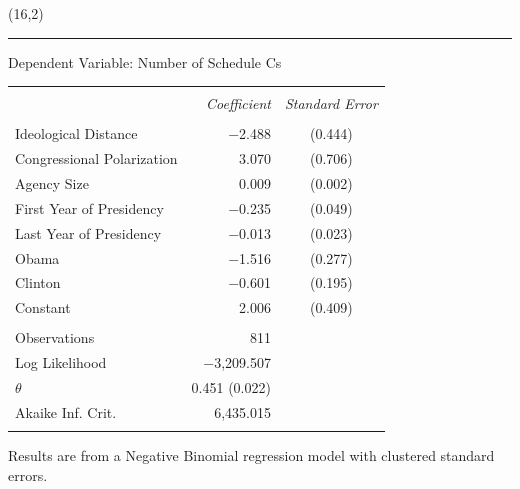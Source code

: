 \documentclass[a0,landscape]{a0poster}
\def\Head#1{\noindent{\LARGE\color{DarkBlue} #1}}
\begin{document}
\begin{textblock}{7}(16,2)

\hrule \bigskip

\Head{Results}

\bigskip

\begin{Large}

\begin{table}[!htbp] \centering 
Dependent Variable: Number of Schedule Cs
\begin{tabular}{@{\extracolsep{5pt}}lrc} 
\\[-1.8ex]\hline 
\cline{2-3} 
\\[-1.8ex] & \textit{Coefficient} & \textit{Standard Error} \\ 
\hline \\[-1.8ex] 
 Ideological Distance & $-$2.488 & (0.444) \\ 
 Congressional Polarization & 3.070& (0.706) \\ 
 Agency Size & 0.009 & (0.002) \\ 
 First Year of Presidency & $-$0.235 & (0.049) \\ 
 Last Year of Presidency & $-$0.013& (0.023) \\ 
 Obama &  $-$1.516 & (0.277) \\ 
 Clinton  & $-$0.601  & (0.195) \\ 
 Constant & 2.006 & (0.409) \\ 
\hline \\[-1.8ex] 
Observations &  811&\\ 
Log Likelihood & $-$3,209.507 &  \\ 
$\theta$ & 0.451 (0.022) &  \\ 
Akaike Inf. Crit. & 6,435.015 &  \\ 
\hline 
\hline \\[-1.8ex] 
\end{tabular} 

\begin{normalsize}Results are from a Negative Binomial regression model with clustered standard errors.\end{normalsize}
\end{table}  


\end{Large}
\end{textblock}
\end{document}
